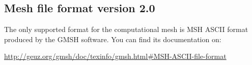 %
%
%
%


\subsection{Mesh file format version 2.0}
\label{mesh_file}

The only supported format for the computational mesh is MSH ASCII format produced 
by the GMSH software. You can find its documentation on:

\url{http://geuz.org/gmsh/doc/texinfo/gmsh.html#MSH-ASCII-file-format}

